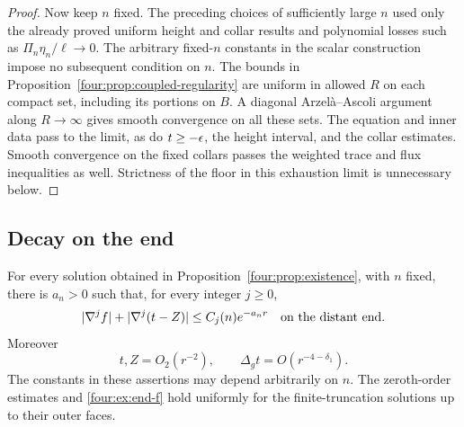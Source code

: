 \begin{proof}
Now keep $n$ fixed.  The preceding choices of sufficiently large $n$
used only the already proved uniform height and collar results and
polynomial losses such as $\Pi_n\eta_n/\ell\to0$.  The arbitrary
fixed-$n$ constants in the scalar construction impose no subsequent
condition on $n$.  The bounds in Proposition~\ref{four:prop:coupled-regularity}
are uniform in allowed $R$ on each compact set, including its portions
on $B$.  A diagonal Arzel\`a--Ascoli argument along $R\to\infty$ gives
smooth convergence on all these sets.  The equation and inner data
pass to the limit, as do $t\ge-\epsilon$, the height interval, and the
collar estimates.  Smooth convergence on the fixed collars passes
the weighted trace and flux inequalities as well.  Strictness of the
floor in this exhaustion limit is unnecessary below.
\end{proof}

\subsection{Decay on the end}

\begin{lemma}\label{four:lem:end-decay}
For every solution obtained in Proposition~\ref{four:prop:existence}, with
$n$ fixed, there is $a_n>0$ such that, for every integer $j\ge0$,
\begin{equation}\label{four:ex:end-f}
 |\nabla^jf|+|\nabla^j(t-Z)|\le C_j(n)e^{-a_nr}
 \quad\hbox{on the distant end}.
\end{equation}
Moreover
\begin{equation}\label{four:ex:end-tz}
 t,Z=O_2(r^{-2}),\qquad \Delta_gt=O(r^{-4-\delta_1}).
\end{equation}
The constants in these assertions may depend arbitrarily on $n$.
The zeroth-order estimates and \eqref{four:ex:end-f} hold uniformly for the
finite-truncation solutions up to their outer faces.
\end{lemma}

